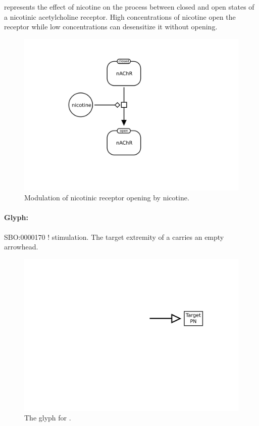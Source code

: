  represents the effect of nicotine on the process between closed and open states of a nicotinic acetylcholine receptor. High concentrations of nicotine open the receptor while low concentrations can desensitize it without opening. 

\begin{figure}[H]
  \centering
  \includegraphics[scale = 0.5]{examples/modulation-nAChR}
  \caption{Modulation of nicotinic receptor opening by nicotine.}
  \label{fig:modul-nico}
\end{figure}


\paragraph{Glyph: }\label{sec:stimulation}


\begin{glyphDescription}
 \glyphSboTerm SBO:0000170 ! stimulation.
 \glyphEndPoint The target extremity of a  carries an empty arrowhead.
 \end{glyphDescription}

\begin{figure}[H]
  \centering
  \includegraphics[scale = 0.5]{images/stimulation}
  \caption{The \PD glyph for .}
  \label{fig:stimulation}
\end{figure}


